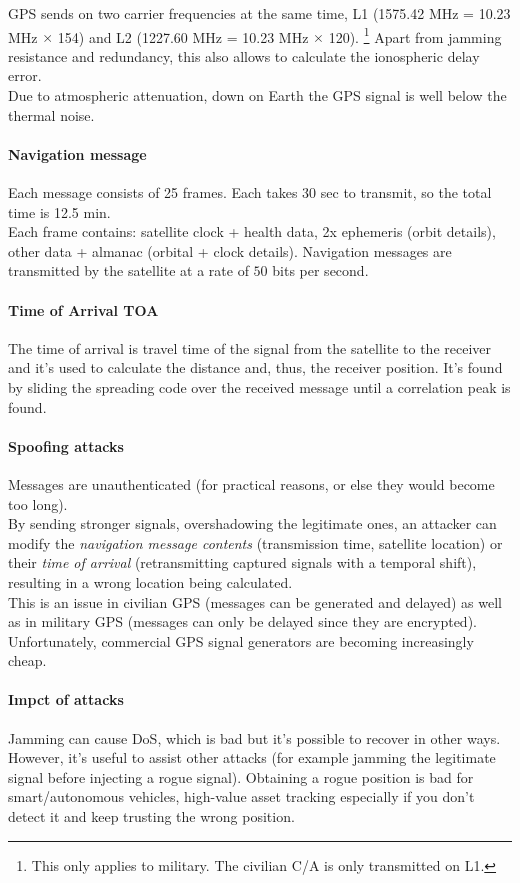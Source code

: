 GPS sends on two carrier frequencies at the same time, L1 (1575.42 MHz = 10.23 MHz $\times$ 154) and L2 (1227.60 MHz = 10.23 MHz $\times$ 120).%
\footnote{This only applies to military. The civilian C/A is only transmitted on L1.}
Apart from jamming resistance and redundancy, this also allows to calculate the ionospheric delay error.
\\
Due to atmospheric attenuation, down on Earth the GPS signal is well below the thermal noise.

\paragraph{Navigation message}
Each message consists of 25 frames.
Each takes 30 sec to transmit, so the total time is 12.5 min.
\\
Each frame contains: satellite clock + health data, 2x ephemeris (orbit details), other data + almanac (orbital + clock details).
Navigation messages are transmitted by the satellite at a rate of $50$ bits per second.

\paragraph{Time of Arrival TOA}
The time of arrival is travel time of the signal from the satellite to the receiver and it's used to calculate the distance and, thus, the receiver position. It's found by sliding the spreading code over the received message until a correlation peak is found.

\paragraph{Spoofing attacks}
Messages are unauthenticated (for practical reasons, or else they would become too long).
\\
By sending stronger signals, overshadowing the legitimate ones, an attacker can modify the \textit{navigation message contents} (transmission time, satellite location) or their \textit{time of arrival} (retransmitting captured signals with a temporal shift), resulting in a wrong location being calculated.
\\
This is an issue in civilian GPS (messages can be generated and delayed) as well as in military GPS (messages can only be delayed since they are encrypted).
Unfortunately, commercial GPS signal generators are becoming increasingly cheap.

\paragraph{Impct of attacks}
Jamming can cause DoS, which is bad but it's possible to recover in other ways. However, it's useful to assist other attacks (for example jamming the legitimate signal before injecting a rogue signal).
Obtaining a rogue position is bad for smart/autonomous vehicles, high-value asset tracking especially if you don't detect it and keep trusting the wrong position.
